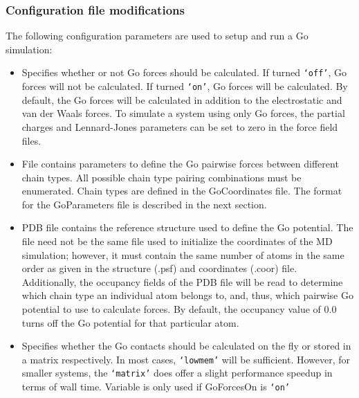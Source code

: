 \subsubsection{Configuration file modifications} 

The following configuration parameters are used to setup and run a Go simulation:

\begin{itemize}

\item
{}
{Specifies whether or not Go forces should be calculated.  If turned {\tt `off'}, 
Go forces will not be calculated.  If turned {\tt `on'}, Go forces will be calculated.  By default,
the Go forces will be calculated in addition to the electrostatic and van der Waals forces.  
To simulate a system using only Go forces, the partial charges and Lennard-Jones parameters can be set to zero in the force field files.}

\item
{}
{File contains parameters to define the Go pairwise forces between different chain types.
All possible chain type pairing combinations must be enumerated.
Chain types are defined in the GoCoordinates file.
The format for the GoParameters file is described in the next section.}

\item
{}
{PDB file contains the reference structure used to define the Go potential.  
The file need not be the same file used to initialize the coordinates of the MD simulation; however,
it must contain the same number of atoms in the same order as given in the structure (.psf) and coordinates (.coor) file.
Additionally, the occupancy fields of the PDB file will be read to determine which chain type an individual atom belongs to, and, thus,
which pairwise Go potential to use to calculate forces.  By default, the occupancy value of 0.0 turns off the Go potential
for that particular atom.
}

\item
{}
{Specifies whether the Go contacts should be calculated on the fly or stored in a matrix respectively.
In most cases, {\tt `lowmem'} will be sufficient.  However, for smaller systems, the {\tt `matrix'}
does offer a slight performance speedup  in terms of wall time.
  Variable is only used if GoForcesOn is {\tt `on'}}

\end{itemize}

